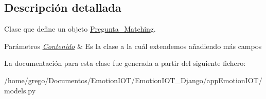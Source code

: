 \subsection{Descripción detallada}
Clase que define un objeto \hyperlink{classappEmotionIOT_1_1models_1_1Pregunta__Matching}{Pregunta\+\_\+\+Matching}. 


\begin{DoxyParams}{Parámetros}
{\em \hyperlink{classappEmotionIOT_1_1models_1_1Contenido}{Contenido}} & Es la clase a la cuál extendemos añadiendo más campos \\
\hline
\end{DoxyParams}


La documentación para esta clase fue generada a partir del siguiente fichero\+:\begin{DoxyCompactItemize}
\item 
/home/grego/\+Documentos/\+Emotion\+I\+O\+T/\+Emotion\+I\+O\+T\+\_\+\+Django/app\+Emotion\+I\+O\+T/models.\+py\end{DoxyCompactItemize}
